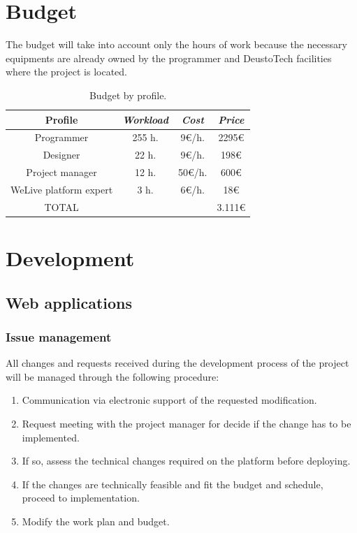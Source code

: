 \documentclass{DeustoFDP}
\begin{document}
\chapter{Budget}
The budget will take into account only the hours of work because the necessary equipments are already owned by the programmer and DeustoTech facilities where the project is located.

\begin{table}[H]
	\centering
	\caption{Budget by profile.}\label{tab:budgetprofile}
	\begin{tabular}{cccc}
		\toprule
		\textbf{Profile} & \emph{Workload} & \emph{Cost} & \emph{Price}\\
		\midrule
		Programmer  & 255 h.     & 9€/h. & 2295€ \\
		Designer   & 22 h.     & 9€/h. & 198€ \\
		Project manager & 12 h.     & 50€/h.  & 600€ \\
		WeLive platform expert & 3 h.     & 6€/h. & 18€ \\
		TOTAL & & & 3.111€\\
		\bottomrule
	\end{tabular}
\end{table}

\chapter{Development}
\section{Web applications}
\subsection{Issue management}
All changes and requests received during the development process of the project will be managed through the following procedure:
\begin{enumerate}
	\item Communication via electronic support of the requested modification.
	\item Request meeting with the project manager for decide if the change has to be implemented.
	\item If so, assess the technical changes required on the platform before deploying.
	\item If the changes are technically feasible and fit the budget and schedule, proceed to implementation.
	\item Modify the work plan and budget.
\end{enumerate}
\end{document}
